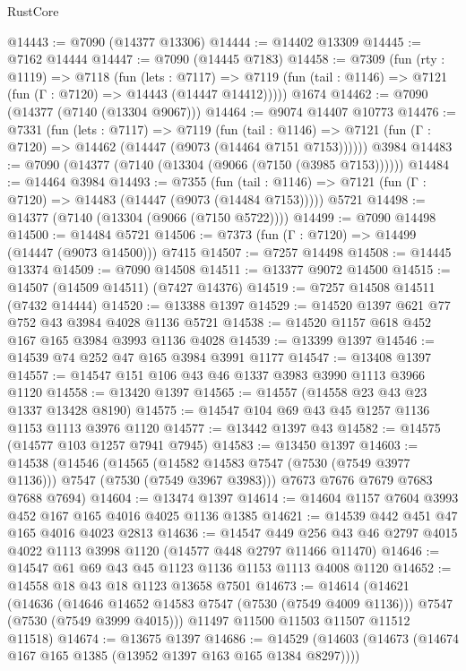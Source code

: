 \begin{lexlean}{RustCore}
\begin{coremodule}
@14443 := @7090 (@14377 @13306)
@14444 := @14402 @13309
@14445 := @7162 @14444
@14447 := @7090 (@14445 @7183)
@14458 := @7309
    (fun (rty : @1119) =>
    @7118
      (fun (lets : @7117) =>
      @7119 (fun (tail : @1146) => @7121 (fun (Γ : @7120) => @14443 (@14447 @14412)))))
    @1674
@14462 := @7090 (@14377 (@7140 (@13304 @9067)))
@14464 := @9074 @14407 @10773
@14476 := @7331
    (fun (lets : @7117) =>
    @7119
      (fun (tail : @1146) =>
      @7121 (fun (Γ : @7120) => @14462 (@14447 (@9073 (@14464 @7151 @7153))))))
    @3984
@14483 := @7090 (@14377 (@7140 (@13304 (@9066 (@7150 (@3985 @7153))))))
@14484 := @14464 @3984
@14493 := @7355
    (fun (tail : @1146) => @7121 (fun (Γ : @7120) => @14483 (@14447 (@9073 (@14484 @7153)))))
    @5721
@14498 := @14377 (@7140 (@13304 (@9066 (@7150 @5722))))
@14499 := @7090 @14498
@14500 := @14484 @5721
@14506 := @7373 (fun (Γ : @7120) => @14499 (@14447 (@9073 @14500))) @7415
@14507 := @7257 @14498
@14508 := @14445 @13374
@14509 := @7090 @14508
@14511 := @13377 @9072 @14500
@14515 := @14507 (@14509 @14511) (@7427 @14376)
@14519 := @7257 @14508 @14511 (@7432 @14444)
@14520 := @13388 @1397
@14529 := @14520 @1397 @621 @77 @752 @43 @3984 @4028 @1136 @5721
@14538 := @14520 @1157 @618 @452 @167 @165 @3984 @3993 @1136 @4028
@14539 := @13399 @1397
@14546 := @14539 @74 @252 @47 @165 @3984 @3991 @1177
@14547 := @13408 @1397
@14557 := @14547 @151 @106 @43 @46 @1337 @3983 @3990 @1113 @3966 @1120
@14558 := @13420 @1397
@14565 := @14557 (@14558 @23 @43 @23 @1337 @13428 @8190)
@14575 := @14547 @104 @69 @43 @45 @1257 @1136 @1153 @1113 @3976 @1120
@14577 := @13442 @1397 @43
@14582 := @14575 (@14577 @103 @1257 @7941 @7945)
@14583 := @13450 @1397
@14603 := @14538
    (@14546
      (@14565 (@14582 @14583 @7547 (@7530 (@7549 @3977 @1136))) @7547 (@7530 (@7549 @3967 @3983)))
      @7673
      @7676
      @7679
      @7683
      @7688
      @7694)
@14604 := @13474 @1397
@14614 := @14604 @1157 @7604 @3993 @452 @167 @165 @4016 @4025 @1136 @1385
@14621 := @14539 @442 @451 @47 @165 @4016 @4023 @2813
@14636 := @14547
    @449
    @256
    @43
    @46
    @2797
    @4015
    @4022
    @1113
    @3998
    @1120
    (@14577 @448 @2797 @11466 @11470)
@14646 := @14547 @61 @69 @43 @45 @1123 @1136 @1153 @1113 @4008 @1120
@14652 := @14558 @18 @43 @18 @1123 @13658 @7501
@14673 := @14614
    (@14621
      (@14636
        (@14646 @14652 @14583 @7547 (@7530 (@7549 @4009 @1136)))
        @7547
        (@7530 (@7549 @3999 @4015)))
      @11497
      @11500
      @11503
      @11507
      @11512
      @11518)
@14674 := @13675 @1397
@14686 := @14529 (@14603 (@14673 (@14674 @167 @165 @1385 (@13952 @1397 @163 @165 @1384 @8297))))

\end{coremodule}
\end{lexlean}
